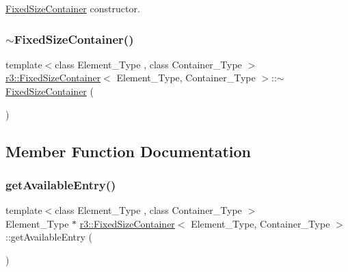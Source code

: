 \mbox{\hyperlink{classr3_1_1_fixed_size_container}{Fixed\+Size\+Container}} constructor. 

\mbox{\label{classr3_1_1_fixed_size_container_af235a796be8de5a9e96c788b676b59fa}} 
\subsubsection{\texorpdfstring{$\sim$\+Fixed\+Size\+Container()}{~FixedSizeContainer()}}
{\footnotesize\ttfamily template$<$class Element\+\_\+\+Type , class Container\+\_\+\+Type $>$ \\
\mbox{\hyperlink{classr3_1_1_fixed_size_container}{r3\+::\+Fixed\+Size\+Container}}$<$ Element\+\_\+\+Type, Container\+\_\+\+Type $>$\+::$\sim$\mbox{\hyperlink{classr3_1_1_fixed_size_container}{Fixed\+Size\+Container}} (\begin{DoxyParamCaption}{ }\end{DoxyParamCaption})\hspace{0.3cm}{\ttfamily [default]}}



\subsection{Member Function Documentation}
\mbox{\label{classr3_1_1_fixed_size_container_a7903fc6d43600195b97218aead60a99a}} 
\subsubsection{\texorpdfstring{get\+Available\+Entry()}{getAvailableEntry()}}
{\footnotesize\ttfamily template$<$class Element\+\_\+\+Type , class Container\+\_\+\+Type $>$ \\
Element\+\_\+\+Type $\ast$ \mbox{\hyperlink{classr3_1_1_fixed_size_container}{r3\+::\+Fixed\+Size\+Container}}$<$ Element\+\_\+\+Type, Container\+\_\+\+Type $>$\+::get\+Available\+Entry (\begin{DoxyParamCaption}{ }\end{DoxyParamCaption})}



